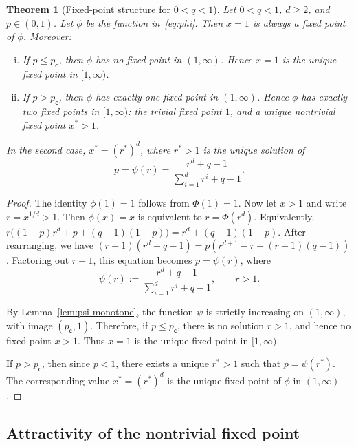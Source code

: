 \documentclass[11pt]{amsart}
\theoremstyle{plain}
\newtheorem{theorem}{Theorem}[section]
\theoremstyle{definition}
\theoremstyle{remark}
\newcommand{\pc}{p_{\mathsf{c}}}
\begin{document}
\begin{theorem}[Fixed-point structure for \(0<q<1\)]
\label{thm:fixed-point-structure}
Let \(0<q<1\), \(d\ge2\), and \(p\in(0,1)\). Let \(\phi\) be the function in~\eqref{eq:phi}. Then \(x=1\) is always a fixed point of \(\phi\). Moreover:
\begin{enumerate}[(i)]
    \item If \(p\le \pc\), then \(\phi\) has no fixed point in \((1,\infty)\). Hence \(x=1\) is the unique fixed point in \([1,\infty)\).

    \item If \(p>\pc\), then \(\phi\) has exactly one fixed point in \((1,\infty)\). Hence \(\phi\) has exactly two fixed points in \([1,\infty)\): the trivial fixed point \(1\), and a unique nontrivial fixed point \(x^*>1\).
\end{enumerate}
In the second case, $x^*=(r^*)^d$, where \(r^*>1\) is the unique solution of 
\[
    p=\psi(r)
    =
    \frac{
        r^d+q-1
    }{
        \sum_{i=1}^{d}r^i+q-1
    }.
\]
\end{theorem}

\begin{proof}
The identity \(\phi(1)=1\) follows from \(\Phi(1)=1\). Now let \(x>1\) and write \(r=x^{1/d}>1\). Then \(\phi(x)=x\) is equivalent to $r=\Phi(r^d)$. 
Equivalently, $r\bigl((1-p)r^d+p+(q-1)(1-p)\bigr)=r^d+(q-1)(1-p)$. After rearranging, we have $(r-1)(r^d+q-1)=p(r^{d+1}-r+(r-1)(q-1))$. Factoring out \(r-1\), this equation becomes $p=\psi(r)$, where
\begin{equation}
\label{eq:psi}
    \psi(r)
    :=
    \frac{
        r^d+q-1
    }{
        \sum_{i=1}^{d}r^i+q-1
    },
    \qquad r>1.
\end{equation}

By Lemma~\ref{lem:psi-monotone}, the function \(\psi\) is strictly increasing on \((1,\infty)\), with image $(\pc,1)$. Therefore, if \(p\le \pc\), there is no solution \(r>1\), and hence no fixed point \(x>1\). Thus \(x=1\) is the unique fixed point in \([1,\infty)\).

If \(p>\pc\), then since \(p<1\), there exists a unique \(r^*>1\) such that $p=\psi(r^*)$. The corresponding value $x^*=(r^*)^d$ is the unique fixed point of \(\phi\) in \((1,\infty)\).
\end{proof}

\subsection{Attractivity of the nontrivial fixed point}
\label{subsec:attractivity}
\end{document}
